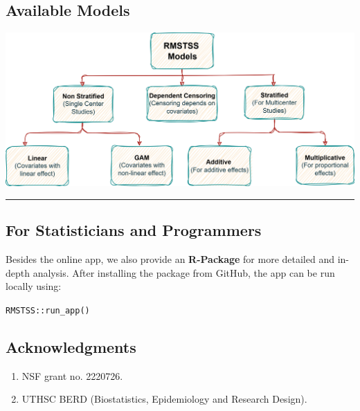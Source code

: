 \documentclass[a0,landscape]{a0poster}
\begin{document}
\begin{minipage}[t]{0.48\linewidth}
    \subsection*{\Large Available Models}
    \begin{center}
        \includegraphics[width=\linewidth]{images/app-models.png}
    \end{center}
    
\end{minipage}

\rule{\linewidth}{1pt} %
\hspace{0.1cm}

\begin{minipage}[t]{0.5\linewidth}
    \subsection*{\Large For Statisticians and Programmers}
    \large Besides the online app, we also provide an \textbf{R-Package} for more detailed and in-depth analysis. After installing the package from GitHub, the app can be run locally using:\begin{alltt} RMSTSS::run_app() \end{alltt}
\end{minipage}
\hfill
\begin{minipage}[t]{0.45\linewidth}
    \subsection*{\Large Acknowledgments}
    \begin{enumerate}
        \item NSF grant no. 2220726.
        \item UTHSC BERD (Biostatistics, Epidemiology and Research Design).
    \end{enumerate}
\end{minipage}

\end{document}
